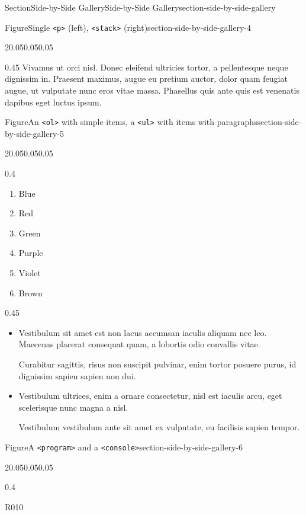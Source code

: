\documentclass[twoside,10pt,]{article}
\newcommand{\mono}[1]{\texttt{#1}}
\numberwithin{equation}{section}
\begin{document}
\begin{sectionptx}{Section}{Side-by-Side Gallery}{}{Side-by-Side Gallery}{}{}{section-side-by-side-gallery}
\begin{figureptx}{Figure}{Single \mono{<p>} (left), \mono{<stack>} (right)}{section-side-by-side-gallery-4}{}
\begin{sidebyside}{2}{0.05}{0.05}{0.05}
\begin{sbspanel}{0.45}
Vivamus ut orci nisl. Donec eleifend ultricies tortor, a pellentesque neque dignissim in. Praesent maximus, augue eu pretium auctor, dolor quam feugiat augue, ut vulputate nunc eros vitae massa. Phasellus quis ante quis est venenatis dapibus eget luctus ipsum.%
\end{sbspanel}%
\end{sidebyside}%
\tcblower
\end{figureptx}%
\begin{figureptx}{Figure}{An \mono{<ol>} with simple items, a \mono{<ul>} with items with paragraphs}{section-side-by-side-gallery-5}{}%
\begin{sidebyside}{2}{0.05}{0.05}{0.05}%
\begin{sbspanel}{0.4}%
%
\begin{enumerate}
\item{}Blue%
\item{}Red%
\item{}Green%
\item{}Purple%
\item{}Violet%
\item{}Brown%
\end{enumerate}
\end{sbspanel}%
\begin{sbspanel}{0.45}%
%
\begin{itemize}[label=\textbullet]
\item{}Vestibulum sit amet est non lacus accumsan iaculis aliquam nec leo. Maecenas placerat consequat quam, a lobortis odio convallis vitae.%
\par
Curabitur sagittis, risus non suscipit pulvinar, enim tortor posuere purus, id dignissim sapien sapien non dui.%
\item{}Vestibulum ultrices, enim a ornare consectetur, nisl est iaculis arcu, eget scelerisque nunc magna a nisl.%
\par
Vestibulum vestibulum ante sit amet ex vulputate, eu facilisis sapien tempor.%
\end{itemize}
\end{sbspanel}%
\end{sidebyside}%
\tcblower
\end{figureptx}%
\begin{figureptx}{Figure}{A \mono{<program>} and a \mono{<console>}}{section-side-by-side-gallery-6}{}%
\begin{sidebyside}{2}{0.05}{0.05}{0.05}%
\begin{sbspanel}{0.4}%
\begin{program}{R}{0}{1}{0}

\end{program}
\end{sbspanel}
\end{sidebyside}
\end{figureptx}
\end{sectionptx}
\end{document}
